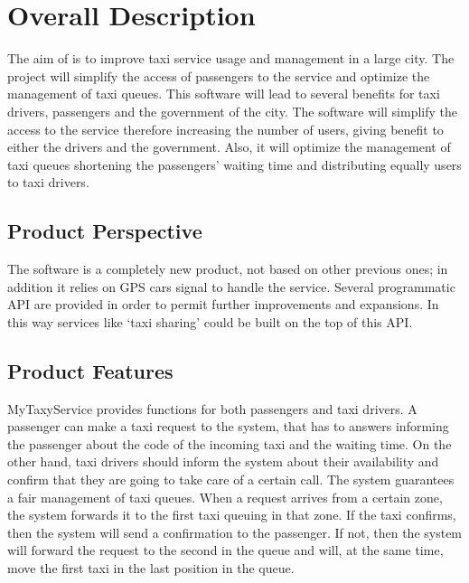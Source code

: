 \section{Overall Description}
The aim of \myTaxiService{} is to improve taxi service usage and management in a large city.
The project will simplify the access of passengers to the service and optimize the management of taxi queues.
This software will lead to several benefits for taxi drivers, passengers and the government of the city.
The software will simplify the access to the service therefore increasing the number of users, giving benefit to either the drivers and the government.
Also, it will optimize the management of taxi queues shortening the passengers’ waiting time and distributing equally users to taxi drivers.
\subsection{Product Perspective}
The software is a completely new product, not based on other previous ones; in addition it relies on GPS cars signal to handle the service. Several programmatic API are provided in order to permit further improvements and expansions. In this way services like ‘taxi sharing’ could be built on the top of this API.
\subsection{Product Features}
MyTaxyService provides functions for both passengers and taxi drivers.
A passenger can make a taxi request to the system, that has to answers informing the passenger about the code of the incoming taxi and the waiting time.
On the other hand, taxi drivers should inform the system about their availability and confirm that they are going to take care of a certain call. The system guarantees a fair management of taxi queues. When a request arrives from a certain zone, the system forwards it to the first taxi queuing in that zone. If the taxi confirms, then the system will send a confirmation to the passenger. If not, then the system will forward the request to the second in the queue and will, at the same time, move the first taxi in the last position in the queue.
